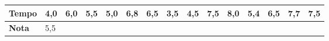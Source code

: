 \documentclass[12pt,brazil,oneside]{book}
\begin{document}
\begin{longtable}[]{@{}lllllllllllllll@{}}
\begin{minipage}[b]{0.10\columnwidth}
\textbf{Tempo}\strut
\end{minipage} & \begin{minipage}[b]{0.04\columnwidth}\raggedright
4,0\strut
\end{minipage} & \begin{minipage}[b]{0.04\columnwidth}\raggedright
6,0\strut
\end{minipage} & \begin{minipage}[b]{0.04\columnwidth}\raggedright
5,5\strut
\end{minipage} & \begin{minipage}[b]{0.04\columnwidth}\raggedright
5,0\strut
\end{minipage} & \begin{minipage}[b]{0.04\columnwidth}\raggedright
6,8\strut
\end{minipage} & \begin{minipage}[b]{0.04\columnwidth}\raggedright
6,5\strut
\end{minipage} & \begin{minipage}[b]{0.04\columnwidth}\raggedright
3,5\strut
\end{minipage} & \begin{minipage}[b]{0.04\columnwidth}\raggedright
4,5\strut
\end{minipage} & \begin{minipage}[b]{0.04\columnwidth}\raggedright
7,5\strut
\end{minipage} & \begin{minipage}[b]{0.04\columnwidth}\raggedright
8,0\strut
\end{minipage} & \begin{minipage}[b]{0.04\columnwidth}\raggedright
5,4\strut
\end{minipage} & \begin{minipage}[b]{0.04\columnwidth}\raggedright
6,5\strut
\end{minipage} & \begin{minipage}[b]{0.04\columnwidth}\raggedright
7,7\strut
\end{minipage} & \begin{minipage}[b]{0.04\columnwidth}\raggedright
7,5\strut
\end{minipage}\tabularnewline
\midrule
\endhead
\begin{minipage}[t]{0.10\columnwidth}\raggedright
\textbf{Nota}\strut
\end{minipage} & \begin{minipage}[t]{0.04\columnwidth}\raggedright
5,5\strut
\end{minipage} & \begin{minipage}[t]{0.04\columnwidth}\raggedright

\end{minipage}
\end{longtable}
\end{document}
